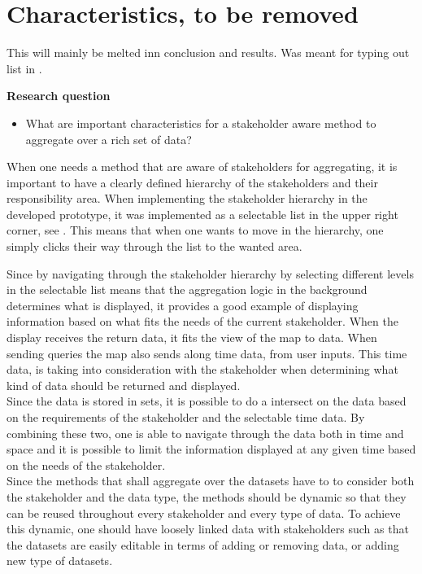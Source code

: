 
\section{Characteristics, to be removed} %
\label{sec:characteristics}
This will mainly be melted inn conclusion and results. Was meant for typing out
list in .

\textbf{Research question}
\begin{itemize}
	\item What are important characteristics for a stakeholder aware method to 
	aggregate over a rich set of data?
\end{itemize}

When one needs a method that are aware of stakeholders for aggregating, it is
important to have a clearly defined hierarchy of the stakeholders and their 
responsibility area. When implementing the stakeholder hierarchy in the
developed prototype, it was implemented as a selectable list in the upper right
corner, see . This means that when 
one wants to move in the hierarchy, one simply clicks their way through the 
list to the wanted area.


Since by navigating through the stakeholder hierarchy by selecting different
levels in the selectable list means that the aggregation logic in the 
background determines what is displayed, it provides a good example of
displaying information based on what fits the needs of the current stakeholder.
When the display receives the return data, it fits the view of the map to
data. When sending queries the map also sends along time data, from user 
inputs. This time data, is taking into consideration with the stakeholder when 
determining what kind of data should be returned and displayed.\\

Since the data is stored in sets, it is possible to do a intersect on the data
based on the requirements of the stakeholder and the selectable time data.
By combining these two, one is able to navigate through the  data both in time 
and space and it is possible to limit the information displayed at any given
time based on the needs of the stakeholder.\\


Since the methods that shall aggregate over the datasets have to to consider
both the stakeholder and the data type, the methods should be dynamic so that
they can be reused throughout every stakeholder and every type of data. To 
achieve this dynamic, one should have loosely linked data with stakeholders
such as that the datasets are easily editable in terms of adding or removing
data, or adding new type of datasets.

